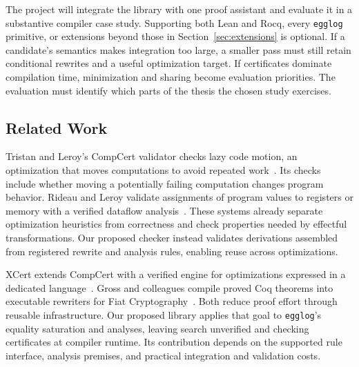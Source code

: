 The project will integrate the library with one proof assistant
  and evaluate it in a substantive compiler case study.
Supporting both Lean and Rocq, every \texttt{egglog} primitive,
  or extensions beyond those in Section~\ref{sec:extensions} is optional.
If a candidate's semantics makes integration too large, a smaller pass must still
  retain conditional rewrites and a useful optimization target.
If certificates dominate compilation time, minimization and sharing become evaluation priorities.
The evaluation must identify which parts of the thesis the chosen study exercises.

\subsection{Related Work}
\label{sec:related-verified-compilation}

Tristan and Leroy's CompCert validator checks lazy code motion,
  an optimization that moves computations to avoid repeated work~\cite{verified-lazy-code-motion}.
Its checks include whether moving a potentially failing computation changes program behavior.
Rideau and Leroy validate assignments of program values to registers or memory
  with a verified dataflow analysis~\cite{validated-register-allocation}.
These systems already separate optimization heuristics from correctness
  and check properties needed by effectful transformations.
Our proposed checker instead validates derivations assembled from registered rewrite and analysis rules,
  enabling reuse across optimizations.

XCert extends CompCert with a verified engine for optimizations expressed in a dedicated language~\cite{xcert}.
Gross and colleagues compile proved Coq theorems into executable rewriters for Fiat Cryptography~\cite{verified-rewriting}.
Both reduce proof effort through reusable infrastructure.
Our proposed library applies that goal to \texttt{egglog}'s equality saturation and analyses,
  leaving search unverified and checking certificates at compiler runtime.
Its contribution depends on the supported rule interface, analysis premises,
  and practical integration and validation costs.

